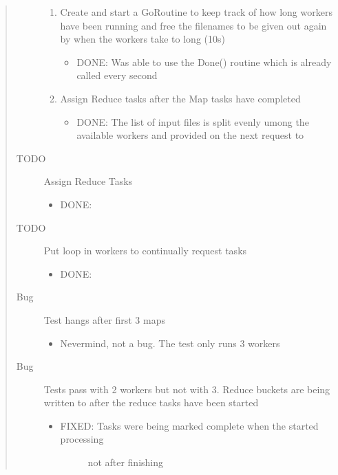 \documentclass[letterpaper,10pt,english]{sphinxmanual}
\begin{document}
\begin{quote}
\begin{description}
\begin{enumerate}
\begin{itemize}
\end{itemize}

\end{enumerate}
\begin{enumerate}
%
\setcounter{enumi}{4}
\item {} 
Create and start a GoRoutine to keep track of how long
workers have been running and free the filenames to be given
out again by  when the workers take to long (10s)
\begin{itemize}
\item {} 
DONE: Was able to use the Done() routine which is already called
every second

\end{itemize}

\item {} 
Assign Reduce tasks after the Map tasks have completed
\begin{itemize}
\item {} 
DONE: The list of input files is split evenly umong the
available workers and provided on the next request to

\end{itemize}

\end{enumerate}

\item[{TODO}] \leavevmode
Assign Reduce Tasks
\begin{itemize}
\item {} 
DONE:

\end{itemize}

\item[{TODO}] \leavevmode
Put loop in workers to continually request tasks
\begin{itemize}
\item {} 
DONE:

\end{itemize}

\item[{Bug}] \leavevmode
Test hangs after first 3 maps
\begin{itemize}
\item {} 
Nevermind, not a bug. The test only runs
3 workers

\end{itemize}

\item[{Bug}] \leavevmode
Tests pass with 2 workers but not with 3. Reduce buckets are being written to after
the reduce tasks have been started
\begin{itemize}
\item {} \begin{description}
\item[{FIXED: Tasks were being marked complete when the started processing}] \leavevmode
not after finishing


\end{description}
\end{itemize}
\end{description}
\end{quote}
\end{document}
